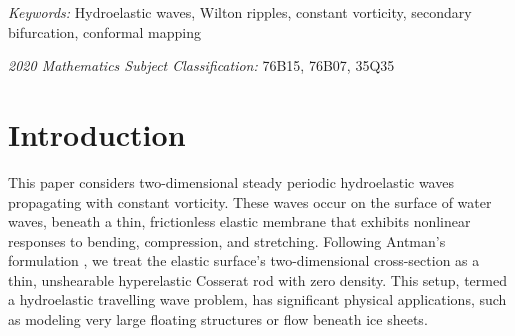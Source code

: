 \documentclass[12pt]{article}
\numberwithin{equation}{section}
\numberwithin{equation}{section}
\begin{document}
\emph{Keywords:} Hydroelastic waves, Wilton ripples, constant vorticity,
secondary bifurcation, conformal mapping


\emph{2020 Mathematics Subject Classification:} 76B15, 76B07, 35Q35

\tableofcontents


\section{Introduction}
This paper considers two-dimensional steady periodic hydroelastic waves
propagating with constant vorticity. These waves occur on the surface of water waves, beneath a thin, frictionless elastic membrane that exhibits nonlinear responses to bending, compression, and stretching. Following Antman's formulation \cite[Chapter 4]{Antman}, we treat the elastic surface's two-dimensional cross-section as a thin, unshearable hyperelastic Cosserat rod with zero density.  This setup, termed a hydroelastic travelling wave problem, has significant physical applications, such as modeling very large floating structures or flow beneath ice sheets.
\end{document}
